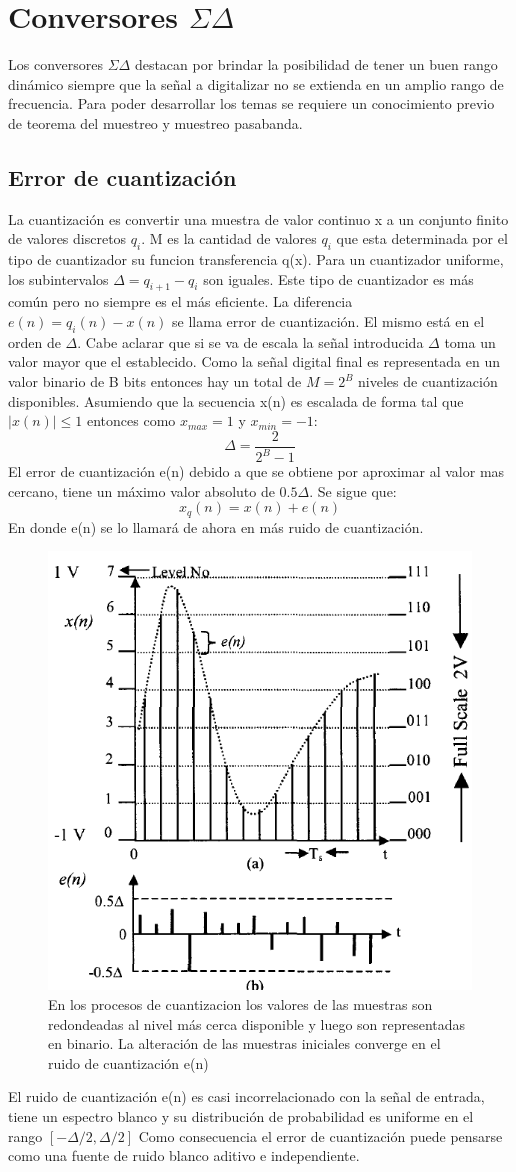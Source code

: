 \documentclass[assd_tp3_main.tex]{subfiles}
\begin{document}
\section{Conversores $\Sigma\Delta$}
Los conversores $\Sigma\Delta$ destacan por brindar la posibilidad de tener un buen rango dinámico siempre que
la señal a digitalizar no se extienda en un amplio rango de frecuencia.
Para poder desarrollar los temas se requiere un conocimiento previo de teorema del muestreo y muestreo pasabanda.
\subsection{Error de cuantización}
La cuantización es convertir una muestra de valor continuo x a un conjunto finito de valores discretos $q_i$.
M es la cantidad de valores $q_i$ que esta determinada por el tipo de cuantizador  su funcion transferencia q(x).
Para un cuantizador uniforme, los subintervalos $\Delta=q_{i+1}-q_i$ son iguales. Este tipo de cuantizador es más común pero no siempre es el más eficiente.
La diferencia $e(n)=q_i(n)-x(n)$ se llama error de cuantización. El mismo está en el orden de $\Delta$.
Cabe aclarar que si se va de escala la señal introducida $\Delta$ toma un valor mayor que el establecido.
Como la señal digital final es representada en un valor binario de B bits entonces hay un total de $M=2^{B}$ niveles de cuantización disponibles.
Asumiendo que la secuencia x(n) es escalada de forma tal que $|x(n)|\leq1$ entonces como $x_{max} =1$ y $x_{min} =-1$:
\[ \Delta= \frac{2}{2^B-1} \]
El error de cuantización e(n) debido a que se obtiene por aproximar al valor mas cercano, tiene un máximo valor absoluto de $0.5\Delta$.
Se sigue que:
\[ x_q(n)= x(n)+e(n)\]
En donde e(n) se lo llamará de ahora en más ruido de cuantización.
\begin{figure}[H]
\centering
\includegraphics[width=0.52\linewidth]{images/ej4/quant_err.png}
\caption{En los procesos de cuantizacion los valores de las muestras son redondeadas al nivel más cerca disponible y luego son representadas en binario. La alteración de las muestras iniciales converge en el ruido de cuantización e(n)}
\label{fig:quant_err}
\end{figure}
El ruido de cuantización e(n) es casi incorrelacionado con la señal de entrada, tiene un espectro blanco y su distribución de probabilidad es uniforme en el rango $[-\Delta/2,\Delta/2]$
Como consecuencia el error de cuantización puede pensarse como una fuente de ruido blanco aditivo e independiente.
\end{document}
